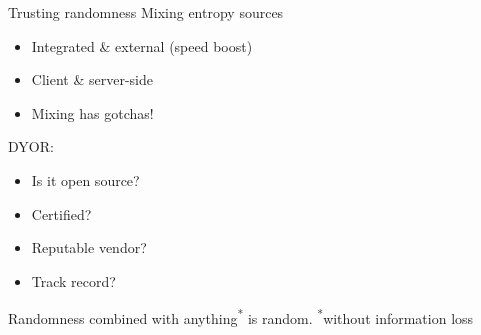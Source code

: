 \begin{frame}{Trusting randomness}
  \pause
  Mixing entropy sources
  \begin{itemize}[<+(1)->]
    \item Integrated \& external (speed boost)
    \item Client \& server-side
    \item Mixing has gotchas!
  \end{itemize}

  \vspace*{0.5em}

  \pause
  DYOR:
  \begin{itemize}[<+(1)->]
    \item Is it open source?
    \item Certified?
    \item Reputable vendor?
    \item Track record?
  \end{itemize}

  \vspace*{0.5em}

  \pause
  Randomness combined with anything\textsuperscript{*} is random.
  {\scriptsize \textsuperscript{*}without information loss}
\end{frame}

